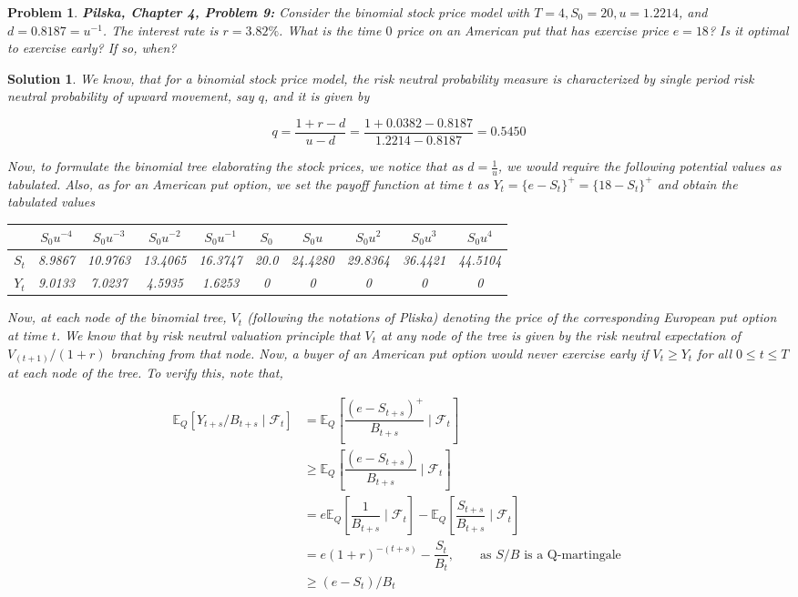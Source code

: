 \documentclass[12pt]{article}
\theoremstyle{problemstyle}
\newtheorem{pbm}{Problem}
\newtheorem*{solution*}{Solution}
\newenvironment{problem}{
\begin{tcolorbox}[colback=green!10!white,colframe=black!75!black, parbox = false]\begin{pbm} }{\end{pbm}\end{tcolorbox} }
\newcommand{\E}{\mathbb{E}}
\begin{document}
\begin{problem}
\textbf{Pilska, Chapter 4, Problem 9: } Consider the binomial stock price model with $T = 4, S_0 = 20, u = 1.2214$, and $d = 0.8187 = u^{-1}$. The interest rate is $r = 3.82\%$. What is the time $0$ price on an American put that has exercise price $e = 18$? Is it optimal to exercise early? If so, when?  
\end{problem}
\begin{solution*}

We know, that for a binomial stock price model, the risk neutral probability measure is characterized by single period risk neutral probability of upward movement, say $q$, and it is given by

$$q = \dfrac{1 + r - d}{u - d} = \dfrac{1 + 0.0382 - 0.8187}{1.2214 - 0.8187} = 0.5450$$

Now, to formulate the binomial tree elaborating the stock prices, we notice that as $d = \frac{1}{u}$, we would require the following potential values as tabulated. Also, as for an American put option, we set the payoff function at time $t$ as $Y_t = \{ e - S_t\}^+ = \{18 - S_t\}^+$ and obtain the tabulated values

\begin{center}
    \begin{tabular}{|c||ccccccccc|} \hline
         & $S_0u^{-4}$ & $S_0u^{-3}$ & $S_0u^{-2}$ & $S_0u^{-1}$ & $S_0$ & $S_0u$ & $S_0u^2$ & $S_0u^3$ & $S_0u^4$\\ \hline 
         $S_t$ & 8.9867 & 10.9763 & 13.4065 & 16.3747 & 20.0 & 24.4280 & 29.8364 &
         36.4421 & 44.5104 \\ \hline 
         $Y_t$ & 9.0133 & 7.0237 & 4.5935 & 1.6253 & 0 & 0 & 0 & 0 & 0 \\ \hline 
    \end{tabular}
\end{center}

Now, at each node of the binomial tree, $V_t$ (following the notations of Pliska) denoting the price of the corresponding European put option at time $t$. We know that by risk neutral valuation principle that $V_t$ at any node of the tree is given by the risk neutral expectation of $V_{(t+1)}/(1+r)$ branching from that node. Now, a buyer of an American put option would never exercise early if $V_t \geq Y_t$ for all $0 \leq t \leq T$ at each node of the tree. To verify this, note that,

\begin{align*}
    \E_Q\left[ Y_{t+s} / B_{t+s} \mid \mathcal{F}_t \right]
    & = \E_Q\left[ \dfrac{(e - S_{t+s})^+}{B_{t+s}} \mid \mathcal{F}_t \right]\\
    & \geq \E_Q\left[ \dfrac{(e - S_{t+s})}{B_{t+s}} \mid \mathcal{F}_t \right]\\
    & = e \E_Q\left[ \dfrac{1}{B_{t+s}} \mid \mathcal{F}_t \right] - \E_Q\left[\dfrac{S_{t+s}}{B_{t+s}} \mid \mathcal{F}_t \right]\\
    & = e (1+ r)^{-(t+s)} - \dfrac{S_t}{B_t}, \qquad \text{as } S/B \text{ is a Q-martingale }\\
    & \geq (e - S_t)/B_t
\end{align*}


\end{solution*}
\end{document}

